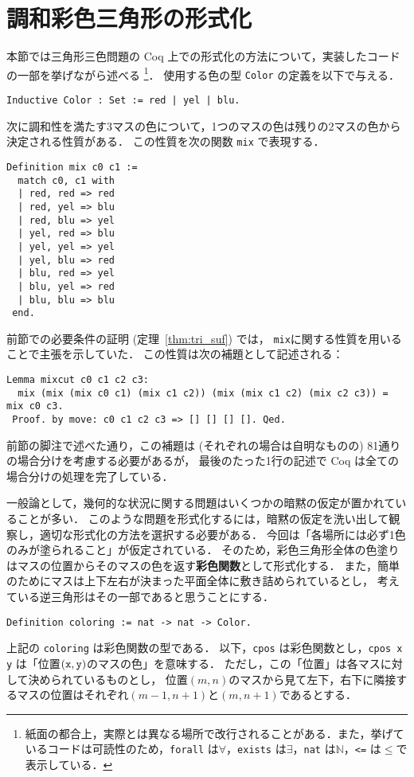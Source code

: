 \section{調和彩色三角形の形式化} \label{sec:dfn}

本節では三角形三色問題の Coq 上での形式化の方法について，実装したコードの一部を挙げながら述べる
\footnote{紙面の都合上，実際とは異なる場所で改行されることがある．また，挙げているコードは可読性のため，{\tt forall} は$\forall$，{\tt exists} は$\exists$，{\tt nat} は$\mathbb{N}$，{\tt <=} は$\leq$で表示している．}．
使用する色の型 {\tt Color} の定義を以下で与える．
\begin{lstlisting}[language=Coq]
 Inductive Color : Set := red | yel | blu.
\end{lstlisting}

次に調和性を満たす3マスの色について，1つのマスの色は残りの2マスの色から決定される性質がある．
この性質を次の関数 {\tt mix} で表現する．
\begin{lstlisting}[language=Coq]
 Definition mix c0 c1 :=
  match c0, c1 with
  | red, red => red
  | red, yel => blu
  | red, blu => yel
  | yel, red => blu
  | yel, yel => yel
  | yel, blu => red
  | blu, red => yel
  | blu, yel => red
  | blu, blu => blu
 end.
\end{lstlisting}

前節での必要条件の証明 (定理~\ref{thm:tri_suf}) では，
{\tt mix}に関する性質を用いることで主張を示していた．
この性質は次の補題として記述される：
\begin{lstlisting}[language=Coq]
 Lemma mixcut c0 c1 c2 c3:
  mix (mix (mix c0 c1) (mix c1 c2)) (mix (mix c1 c2) (mix c2 c3)) = mix c0 c3.
 Proof. by move: c0 c1 c2 c3 => [] [] [] []. Qed.
\end{lstlisting}
前節の脚注で述べた通り，この補題は (それぞれの場合は自明なものの) 81通りの場合分けを考慮する必要があるが，
最後のたった1行の記述で Coq は全ての場合分けの処理を完了している．

一般論として，幾何的な状況に関する問題はいくつかの暗黙の仮定が置かれていることが多い．
このような問題を形式化するには，暗黙の仮定を洗い出して観察し，適切な形式化の方法を選択する必要がある．
今回は「各場所には必ず1色のみが塗られること」が仮定されている．
そのため，彩色三角形全体の色塗りはマスの位置からそのマスの色を返す{\bf 彩色関数}として形式化する．
また，簡単のためにマスは上下左右が決まった平面全体に敷き詰められているとし，
考えている逆三角形はその一部であると思うことにする．
\begin{lstlisting}[language=Coq]
 Definition coloring := nat -> nat -> Color.
\end{lstlisting}
上記の {\tt coloring} は彩色関数の型である．
以下，{\tt cpos} は彩色関数とし，{\tt cpos x y} は「位置$({\tt x},{\tt y})$のマスの色」を意味する．
ただし，この「位置」は各マスに対して決められているものとし，
位置$(m,n)$のマスから見て左下，右下に隣接するマスの位置はそれぞれ$(m-1,n+1)$と$(m,n+1)$であるとする．

